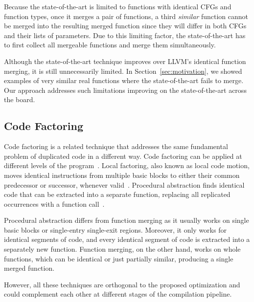 Because the state-of-the-art is limited to functions with identical CFGs
and function types, once it merges a pair of functions, a third
\textit{similar} function cannot be merged into the resulting merged function
since they will differ in both CFGs and their lists of parameters.
Due to this limiting factor, the state-of-the-art has to first collect all
mergeable functions and merge them simultaneously.

Although the state-of-the-art technique improves over LLVM's identical function merging, it is
still unnecessarily limited. In Section~\ref{sec:motivation}, we showed examples of very similar
real functions where the state-of-the-art fails to merge. Our approach addresses such limitations
improving on the state-of-the-art across the board.

\subsection{Code Factoring}

Code factoring is a related technique that addresses the same fundamental
problem of duplicated code in a different way.
Code factoring can be applied at different levels of the program~\cite{loki04}.
Local factoring, also known as local code motion, moves identical instructions
from multiple basic blocks to either their common predecessor or successor,
whenever valid~\cite{knoop94,briggs94,loki04}.
Procedural abstraction %
finds identical code
that can be extracted into a separate function, replacing all replicated
occurrences with a function call~\cite{loki04,dreweke07}.

Procedural abstraction differs from function merging as it usually works on
single basic blocks or single-entry single-exit regions.
Moreover, it only works for identical segments of code, and every identical
segment of code is extracted into a separately new function.
Function merging, on the other hand, works on whole functions, which can be
identical or just partially similar, producing a single merged function.

However, all these techniques are orthogonal to the proposed optimization and
could complement each other at different stages of the compilation pipeline.

